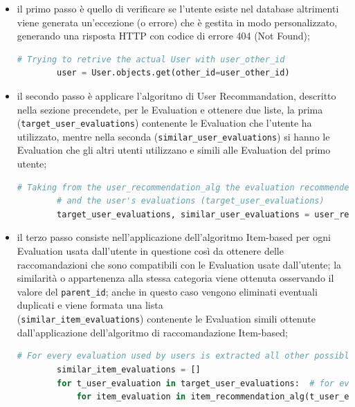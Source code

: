 \begin{itemize}
    \item il primo passo è quello di verificare se l'utente esiste nel database altrimenti viene generata un’eccezione (o errore) che è gestita in 
    modo personalizzato, generando una risposta HTTP con codice di errore 404 (Not Found);
    \begin{lstlisting}[language=Python, label=lst:CF_Hybrid_Evaluation_2]
        # Trying to retrive the actual User with user_other_id
        user = User.objects.get(other_id=user_other_id)
    \end{lstlisting} 
    \item il secondo passo è applicare l'algoritmo di User Recommandation, descritto nella sezione precendete, per le Evaluation e ottenere due liste, 
    la prima (\texttt{target\_user\_evaluations}) contenente le Evaluation che l'utente ha utilizzato, mentre nella seconda (\texttt{similar\_user\_evaluations}) 
    si hanno le Evaluation che gli altri utenti utilizzano e simili alle Evaluation del primo utente;
    \begin{lstlisting}[language=Python, label=lst:CF_Hybrid_Evaluation_3]
        # Taking from the user_recommendation_alg the evaluation recommended from this approach (similar_user_evaluations)
        # and the user's evaluations (target_user_evaluations)
        target_user_evaluations, similar_user_evaluations = user_recommendation_alg(user_other_id)
    \end{lstlisting} 
    \item il terzo passo consiste nell'applicazione dell'algoritmo Item-based per ogni Evaluation usata dall'utente in questione così da ottenere 
    delle raccomandazioni che sono compatibili con le Evaluation usate dall'utente; la similarità o appartenenza alla stessa categoria viene 
    ottenuta osservando il valore del \texttt{parent\_id}; anche in questo caso vengono eliminati eventuali duplicati e viene formata una lista \\
    (\texttt{similar\_item\_evaluations}) contenente le Evaluation simili ottenute dall'applicazione dell'algoritmo di raccomandazione Item-based;
    \begin{lstlisting}[language=Python, label=lst:CF_Hybrid_Evaluation_4]
        # For every evaluation used by users is extracted all other possible evaluations that have the same 'parent_id'
        similar_item_evaluations = []
        for t_user_evaluation in target_user_evaluations:  # for every target user's evaluations
            for item_evaluation in item_recommendation_alg(t_user_evaluation['other_id']):  # is applied the item_recommendation algorithm

\end{lstlisting}
\end{itemize}
